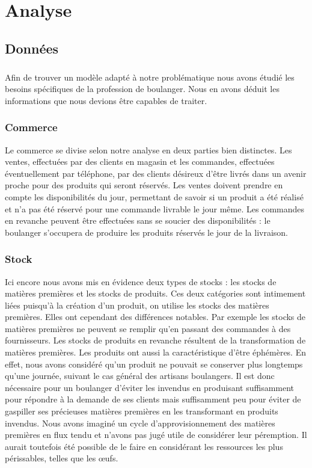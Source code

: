 \chapter{Analyse}

\section{Données}
    \paragraph{}
        Afin de trouver un modèle adapté à notre problématique nous avons étudié
        les besoins spécifiques de la profession de boulanger.
        Nous en avons déduit les informations que nous devions être capables de
        traiter.
    \subsection{Commerce}
        Le commerce se divise selon notre analyse en deux parties bien
        distinctes. 
        Les ventes, effectuées par des clients en magasin et les commandes,
        effectuées éventuellement par téléphone, par des clients désireux d'être
        livrés dans un avenir proche pour des produits qui seront réservés.
        Les ventes doivent prendre en compte les disponibilités du jour,
        permettant de savoir si un produit a été réalisé et n'a pas été réservé
        pour une commande livrable le jour même.
        Les commandes en revanche peuvent être effectuées sans se soucier des 
        disponibilités : le boulanger s'occupera de produire les produits
        réservés le jour de la livraison.
    \subsection{Stock}
        Ici encore nous avons mis en évidence deux types de stocks : les stocks
        de matières premières et les stocks de produits. Ces deux catégories 
        sont intimement liées puisqu'à la création d'un produit, on utilise
        les stocks des matières premières. Elles ont cependant des différences
        notables.
        Par exemple les stocks de matières premières ne peuvent se remplir
        qu'en passant des commandes à des fournisseurs.
        Les stocks de produits en revanche résultent de la transformation de
        matières premières.
        Les produits ont aussi la caractéristique d'être éphémères.
        En effet, nous avons considéré qu'un produit ne pouvait se conserver
        plus longtemps qu'une journée, suivant le cas général des artisans 
        boulangers.
        Il est donc nécessaire pour un boulanger d'éviter les invendus en
        produisant suffisamment pour répondre à la demande de ses clients mais
        suffisamment peu pour éviter de gaspiller ses précieuses matières 
        premières en les transformant en produits invendus.
        Nous avons imaginé un cycle d'approvisionnement des matières premières
        en flux tendu et n'avons pas jugé utile de considérer leur péremption.
        Il aurait toutefois été possible de le faire en considérant les
        ressources les plus périssables, telles que les œufs.
